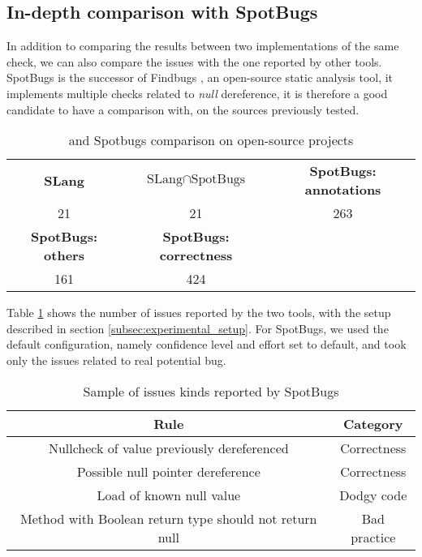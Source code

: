 \subsection{In-depth comparison with SpotBugs}
\label{subsec:indpeth_comparison_spotbugs}

In addition to comparing the results between two implementations of the same check, we can also compare the issues with the one reported by other tools.
SpotBugs \cite{spotBugs:2019:Online} is the successor of Findbugs \cite{FindBugs:2019:Online}, an open-source static analysis tool, it implements multiple checks related to \emph{null} dereference, it is therefore a good candidate to have a comparison with, on the sources previously tested.

\begin{table}[h]
	\centering
	\caption{\slang{} and Spotbugs comparison on open-source projects}
	\label{table:slang_vs_spotbugs}
	\begin{tabular}{|c|c|c|}
		\hline
		\bf SLang & \bf $\text{SLang} \cap \text{SpotBugs}$ & \bf SpotBugs: annotations \\
		21 & 21 & 263 \\ \hline
		\bf SpotBugs: others & \bf SpotBugs: correctness & \\ 
		161 & 424 &  \\ \hline
	\end{tabular}
\end{table}

Table \ref{table:slang_vs_spotbugs} shows the number of issues reported by the two tools, with the setup described in section \ref{subsec:experimental_setup}. 
For SpotBugs, we used the default configuration, namely confidence level and effort set to default, and took only the issues related to real potential bug.

\begin{table}[h]
	\centering
	\caption{Sample of issues kinds reported by SpotBugs}
	\label{table:spotbugs-rules}
	\begin{tabular}{|c|c|}
		\hline
		\bf Rule & \bf Category\\ \hline
		Nullcheck of value previously dereferenced & Correctness  \\
		Possible null pointer dereference & Correctness  \\
		Load of known null value & Dodgy code \\
		Method with Boolean return type should not return null & Bad practice \\ \hline
	\end{tabular}
\end{table}

